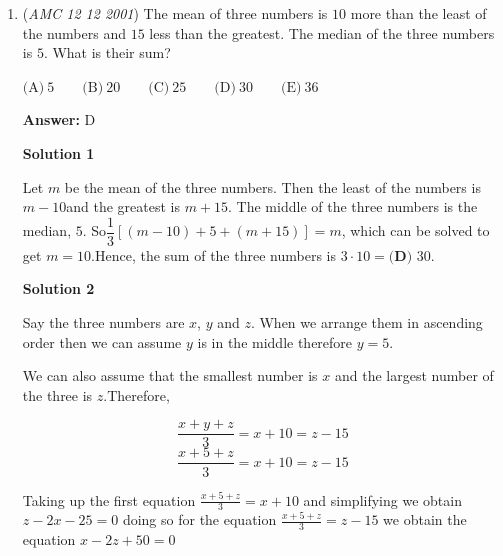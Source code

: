 \begin{enumerate}
 \textbf{Answer: }B



\textbf{Solution 1}

Let $A$, $T$ be Kristin's annual income and the income tax total, respectively. Notice that
 \begin{align*} T &= p\%\cdot28000 + (p + 2)\%\cdot(A - 28000) \\ &= [p\%\cdot28000 + p\%\cdot(A - 28000)] + 2\%\cdot(A - 28000) \\ &= p\%\cdot A + 2\%\cdot(A - 28000) \end{align*}
We are also given that 
 \[T = (p + 0.25)\%\cdot A = p\%\cdot A + 0.25\%\cdot A\]Thus, 
 \[p\%\cdot A + 2\%\cdot(A - 28000) = p\%\cdot A + 0.25\%\cdot A\] 
 \[2\%\cdot(A - 28000) = 0.25\%\cdot A\]Solve for $A$ to obtain $A = \boxed{\textbf{(B) }\textdollar 32000}$.

 Note: You may also assume p = 0 for easy calculation.

 


	\item (\textit{AMC 12 12 2001}) The mean of three numbers is $10$ more than the least of the numbers and $15$
less than the greatest. The median of the three numbers is $5$. What is their
sum?


 $\text{(A)}\ 5\qquad \text{(B)}\ 20\qquad \text{(C)}\ 25\qquad \text{(D)}\ 30\qquad \text{(E)}\ 36$

 \textbf{Answer: }D



\textbf{Solution 1}

Let $m$ be the mean of the three numbers. Then the least of the numbers is $m-10$and the greatest is $m + 15$. The middle of the three numbers is the median, $5$. So$\dfrac{1}{3}[(m-10) + 5 + (m + 15)] = m$, which can be solved to get $m=10$.Hence, the sum of the three numbers is $3\cdot 10 = \boxed{\textbf{(D) }30}$.

 



\textbf{Solution 2}

Say the three numbers are $x$, $y$ and $z$. When we arrange them in ascending order then we can assume $y$ is in the middle therefore $y = 5$. 

 We can also assume that the smallest number is $x$ and the largest number of the three is $z$.Therefore,

 
 \[\frac{x+y+z}{3} = x + 10 = z - 15\]
 \[\frac{x+5+z}{3} = x + 10 = z - 15\]

 Taking up the first equation $\frac{x+5+z}{3} = x + 10$ and simplifying we obtain $z - 2x - 25 = 0$ doing so for the equation $\frac{x+5+z}{3} = z - 15$ we obtain the equation $x - 2z + 50 = 0$


\end{enumerate}

